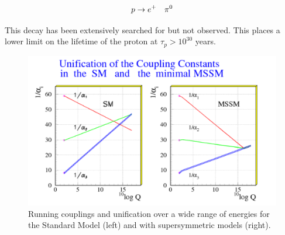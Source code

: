 \[
  p \to e^+ \quad \pi^0
\]

This decay has been extensively searched for but not observed.  This places a lower limit on the lifetime of the proton at $\tau_p > 10^{30}$ years.

\begin{figure}[!htb]
  \begin{center}
    \includegraphics[width=\textwidth]{images/chapter_1/SUSYUnification.pdf}
    \caption[Running couplings and unification]{Running couplings and unification over a wide range of energies for the Standard Model (left) and with supersymmetric models (right). \cite{SUSYUnification}}
    \label{fig:ch1_SUSYUnification}
  \end{center}
\end{figure}
